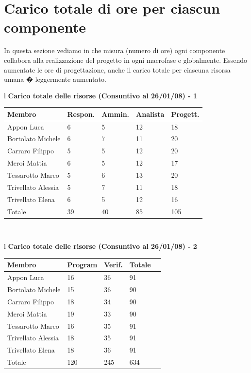 \documentclass[11pt,titlepage,a4paper]{report}
\begin{document}
\newpage

\section{Carico totale di ore per ciascun componente}
In questa sezione vediamo in che misura (numero di ore) ogni componente collabora alla 
realizzazione del progetto in ogni macrofase e globalmente.
Essendo aumentate le ore di progettazione, anche il carico totale 
per ciascuna risorsa umana � leggermente aumentato.

\begin{table}[hbtp]
\large{
\begin{tabular}{l}
\Large{\textbf{\textsf{Carico totale delle risorse (Consuntivo al 26/01/08) - 1}}} \\
\begin{tabular}{||p{3.5cm}||p{2cm}||p{2cm}||p{2cm}||p{2cm}||}
\hline
\textbf{Membro} & \textbf{Respon.} & \textbf{Ammin.} & \textbf{Analista}
& \textbf{Progett.}\\
\hline
{Appon Luca}&6&5&12&18 \\ 
\hline 
{Bortolato Michele} &6&7&11&20\\ 
\hline
{Carraro Filippo}&5&5&12&20 \\
\hline
{Meroi Mattia}&6&5&12&17\\
\hline
{Tessarotto Marco} &5&6&13&20\\
\hline
{Trivellato Alessia} &5&7&11&18 \\
\hline
{Trivellato Elena} &6&5&12&16 \\
\hline
{Totale}& 39&40&85&105 \\
\hline
\end{tabular} \\
\end{tabular}
}
\end{table}

\begin{table}[hbtp]
\large{
\begin{tabular}{l}
\Large{\textbf{\textsf{Carico totale delle risorse (Consuntivo al 26/01/08) - 2}}} \\
\begin{tabular}{||p{3.5cm}||p{2cm}||p{2cm}||p{2cm}||p{2cm}||}
\hline
\textbf{Membro} & \textbf{Program} & \textbf{Verif.} & \textbf{Totale}\\
\hline
{Appon Luca}&16&36&91 \\ 
\hline 
{Bortolato Michele} &15&36&90\\ 
\hline
{Carraro Filippo}&18&34&90 \\
\hline
{Meroi Mattia}&19&33&90\\
\hline
{Tessarotto Marco} &16&35&91\\
\hline
{Trivellato Alessia} &18&35&91 \\
\hline
{Trivellato Elena} &18&36&91 \\
\hline
{Totale} &120&245&634 \\
\hline
\end{tabular} \\
\end{tabular}
}
\end{table}
\end{document}
